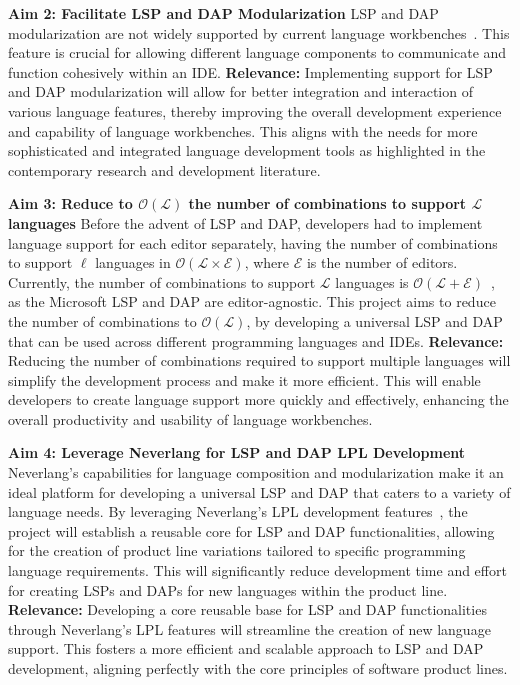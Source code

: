 \hfill \break
\noindent
\textbf{Aim 2: Facilitate LSP and DAP Modularization}
\hfill \break
LSP and DAP modularization are not widely supported by current language workbenches~\cite{Bunder19a}. This feature is crucial for allowing different language components to communicate and function cohesively within an IDE.
\hfill \break
\textbf{Relevance:} Implementing support for LSP and DAP modularization will allow for better integration and interaction of various language features, thereby improving the overall development experience and capability of language workbenches. This aligns with the needs for more sophisticated and integrated language development tools as highlighted in the contemporary research and development literature.

\hfill \break
\noindent
\textbf{Aim 3: Reduce to $\mathcal{O}(\mathcal{L})$ the number of combinations to support $\mathcal{L}$ languages}
\hfill \break
Before the advent of LSP and DAP, developers had to implement language support for each editor separately, having the number of combinations to support $\ell$ languages in $\mathcal{O}(\mathcal{L} \times \mathcal{E})$, where $\mathcal{E}$ is the number of editors.
Currently, the number of combinations to support $\mathcal{L}$ languages is $\mathcal{O}(\mathcal{L} + \mathcal{E})$~\cite{Rodriguez-Echeverria18a}, as the Microsoft LSP and DAP are editor-agnostic. This project aims to reduce the number of combinations to $\mathcal{O}(\mathcal{L})$, by developing a universal LSP and DAP that can be used across different programming languages and IDEs.
\hfill \break
\textbf{Relevance:} Reducing the number of combinations required to support multiple languages will simplify the development process and make it more efficient. This will enable developers to create language support more quickly and effectively, enhancing the overall productivity and usability of language workbenches.

\hfill \break
\noindent
\textbf{Aim 4: Leverage Neverlang for LSP and DAP LPL Development}
\hfill \break
Neverlang's capabilities for language composition and modularization make it an ideal platform for developing a universal LSP and DAP that caters to a variety of language needs. By leveraging Neverlang's LPL development features~\cite{Cazzola20}, the project will establish a reusable core for LSP and DAP functionalities, allowing for the creation of product line variations tailored to specific programming language requirements. This will significantly reduce development time and effort for creating LSPs and DAPs for new languages within the product line.
\hfill \break
\textbf{Relevance:}  Developing a core reusable base for LSP and DAP functionalities through Neverlang's LPL features will streamline the creation of new language support. This fosters a more efficient and scalable approach to LSP and DAP development, aligning perfectly with the core principles of software product lines.

